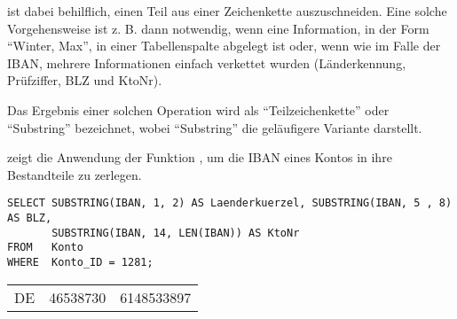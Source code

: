            ist dabei behilflich, einen Teil aus einer Zeichenkette auszuschneiden. Eine solche Vorgehensweise ist z. B. dann notwendig, wenn eine Information, in der Form \enquote{Winter, Max}, in einer Tabellenspalte abgelegt ist oder, wenn wie im Falle der IBAN, mehrere Informationen einfach verkettet wurden (Länderkennung, Prüfziffer, BLZ und KtoNr).

          \begin{merke}
            Das Ergebnis einer solchen Operation wird als \enquote{Teilzeichenkette} oder \enquote{Substring} bezeichnet, wobei \enquote{Substring} die geläufigere Variante darstellt.
          \end{merke}
		  \clearpage
           zeigt die Anwendung der Funktion , um die IBAN eines Kontos in ihre Bestandteile zu zerlegen.
          \begin{lstlisting}[language=ms_sql,caption={Die Anwendung der Funktion \languagemssql{SUBSTRING}},label=sql03_09]
SELECT SUBSTRING(IBAN, 1, 2) AS Laenderkuerzel, SUBSTRING(IBAN, 5 , 8) AS BLZ,
       SUBSTRING(IBAN, 14, LEN(IBAN)) AS KtoNr
FROM   Konto
WHERE  Konto_ID = 1281;
          \end{lstlisting}
\clearpage
          \begin{center}
            \begin{small}
              \tablehead{}
              \begin{mssql}
                \begin{supertabular}{lll}
                  DE & 46538730 & 6148533897 \\
                \end{supertabular}
              \end{mssql}
            \end{small}
          \end{center}
